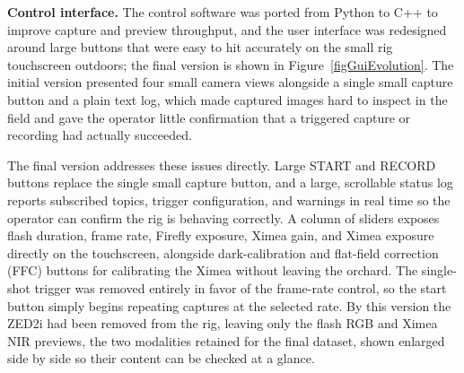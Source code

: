 \textbf{Control interface.}
The control software was ported from Python to C++ to improve
capture and preview throughput, and the user interface was
redesigned around large buttons that were easy to hit accurately on
the small rig touchscreen outdoors; the final version is shown in
Figure~\ref{figGuiEvolution}.
The initial version presented four small camera views alongside a
single small capture button and a plain text log, which made
captured images hard to inspect in the field and gave the operator
little confirmation that a triggered capture or recording had
actually succeeded.

The final version addresses these issues directly.
Large START and RECORD buttons replace the single small capture
button, and a large, scrollable status log reports subscribed
topics, trigger configuration, and warnings in real time so the
operator can confirm the rig is behaving correctly.
A column of sliders exposes flash duration, frame rate, Firefly
exposure, Ximea gain, and Ximea exposure directly on the
touchscreen, alongside dark-calibration and flat-field correction
(FFC) buttons for calibrating the Ximea without leaving the
orchard.
The single-shot trigger was removed entirely in favor of the
frame-rate control, so the start button simply begins repeating
captures at the selected rate.
By this version the ZED2i had been removed from the rig, leaving
only the flash RGB and Ximea NIR previews, the two modalities
retained for the final dataset, shown enlarged side by side so
their content can be checked at a glance.

